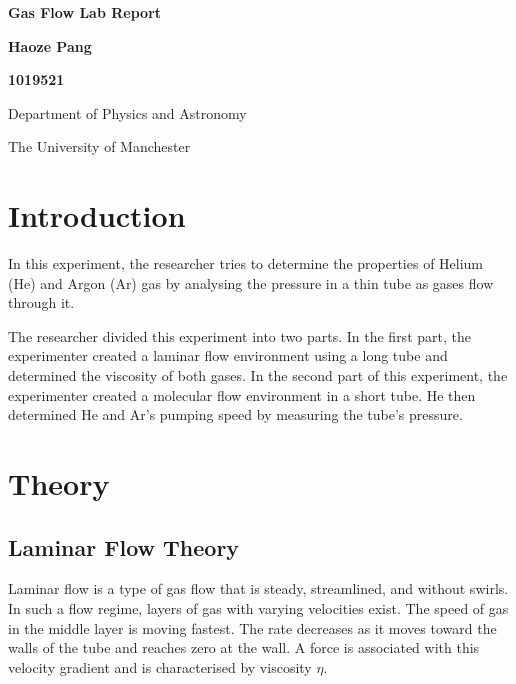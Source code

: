 \documentclass[12pt,a4paper]{article}
\begin{document}
\begin{center}
    \vspace*{0.5cm}
    
    \Huge
    \textbf{Gas Flow Lab Report}
    
    \vspace{0.5cm}
    
    \normalsize
    \textbf{Haoze Pang}
    
    \textbf{1019521}
    
    \vspace{0.5cm}
    
    Department of Physics and Astronomy
    
    The University of Manchester
\end{center}
\vspace{18pt}

	\section{Introduction}
	
	 In this experiment, the researcher tries to determine the properties of Helium (He) and Argon (Ar) gas by analysing the pressure in a thin tube as gases flow through it. 
	
	The researcher divided this experiment into two parts. In the first part, the experimenter created a laminar flow environment using a long tube and determined the viscosity of both gases. 
	In the second part of this experiment, the experimenter created a molecular flow environment in a short tube. He then determined He and Ar's pumping speed by measuring the tube's pressure.
	
	\section{Theory}
	\subsection{Laminar Flow Theory}
		Laminar flow is a type of gas flow that is steady, streamlined, and without swirls. In such a flow regime, layers of gas with varying velocities exist.  The speed of gas in the middle layer is moving fastest. The rate decreases as it moves toward the walls of the tube and reaches zero at the wall. A force is associated with this velocity gradient and is characterised by viscosity $\eta$. 
		
\end{document}
